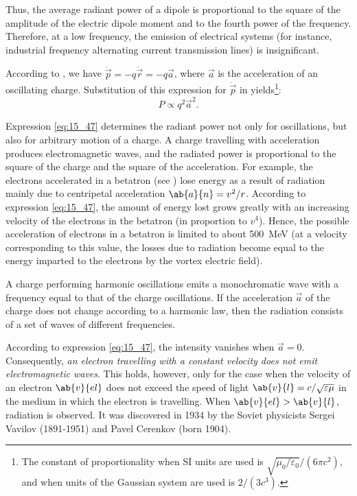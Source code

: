 \noindent
Thus, the average radiant power of a dipole is proportional to the square of the amplitude of the electric dipole moment and to the fourth power of the frequency.
Therefore, at a low frequency, the emission of electrical systems (for instance, industrial frequency alternating current transmission lines) is insignificant.

According to , we have $\ddot{\vec{p}}=-q\ddot{\vec{r}}=-q\vec{a}$, where $\vec{a}$ is the acceleration of an oscillating charge.
Substitution of this expression for $\ddot{\vec{p}}$ in  yields\footnote{The constant of proportionality when SI units are used is $\sqrt{\mu_0/\varepsilon_0}/(6\pi c^2)$, and when units of the Gaussian system are used is $2/(3c^3)$.}:
\begin{equation}\label{eq:15_47}
    P \propto q^2 \vec{a}^2.
\end{equation}

\noindent
Expression \eqref{eq:15_47} determines the radiant power not only for oscillations, but also for arbitrary motion of a charge.
A charge travelling with acceleration produces electromagnetic waves, and the radiated power is proportional to the square of the charge and the
square of the acceleration.
For example, the electrons accelerated in a betatron (see ) lose energy as a result of radiation mainly due to centripetal acceleration $\ab{a}{n}=v^2/r$.
According to expression \eqref{eq:15_47}, the amount of energy lost grows greatly with an increasing velocity of the electrons in the betatron (in proportion to $v^4$).
Hence, the possible acceleration of electrons in a betatron is limited to about \SI{500}{\mega\electronvolt} (at a velocity corresponding to this value, the losses due to radiation become equal to the energy imparted to the electrons by the vortex electric field).

A charge performing harmonic oscillations emits a monochromatic wave with a frequency equal to that of the charge oscillations.
If the acceleration $\vec{a}$ of the charge does not change according to a harmonic law, then the radiation consists of a set of waves of different
frequencies.

According to expression \eqref{eq:15_47}, the intensity vanishes when $\vec{a}=0$.
Consequently, \textit{an electron travelling with a constant velocity does not emit electromagnetic waves}.
This holds, however, only for the case when the velocity of an electron $\ab{v}{el}$ does not exceed the speed of light $\ab{v}{l}=c/\sqrt{\varepsilon\mu}$ in the medium in which the electron is travelling.
When $\ab{v}{el}>\ab{v}{l}$, radiation is observed.
It was discovered in 1934 by the Soviet physicists Sergei Vavilov (1891-1951) and Pavel Cerenkov (born 1904).

